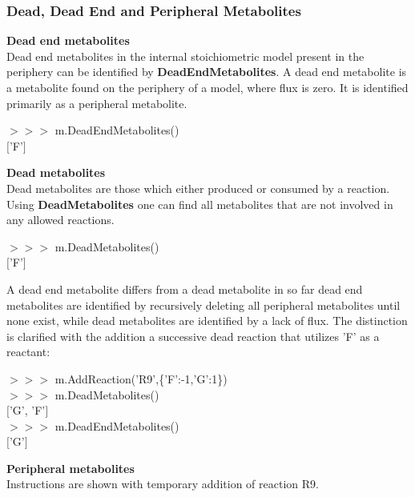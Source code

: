 
\subsubsection{Dead, Dead End and Peripheral Metabolites}

\textbf{Dead end metabolites} \\
Dead end metabolites in the internal stoichiometric model present in the periphery can be identified by \textbf{DeadEndMetabolites}. A dead end metabolite is a metabolite found on the periphery of a model, where flux is zero. It is identified primarily as a peripheral metabolite.

\begin{framed}
$>>>$ m.DeadEndMetabolites()\\
$[$'F'$]$
\end{framed}


\textbf{Dead metabolites}\\
Dead metabolites are those which either produced or consumed by a reaction. Using \textbf{DeadMetabolites} one can find all metabolites that are not involved in any allowed reactions.

\begin{framed}
$>>>$ m.DeadMetabolites()\\
$[$'F'$]$
\end{framed}

A dead end metabolite differs from a dead metabolite in so far dead end metabolites are identified by recursively deleting all peripheral metabolites until none exist, while dead metabolites are identified by a lack of flux. The distinction is clarified with the addition a successive dead reaction that utilizes 'F' as a reactant:

\begin{framed}
$>>>$ m.AddReaction('R9',\{'F':-1,'G':1\})\\
$>>>$ m.DeadMetabolites()\\
$[$'G', 'F'$]$\\

$>>>$ m.DeadEndMetabolites()\\
$[$'G'$]$
\end{framed}


\textbf{Peripheral metabolites}\\
Instructions are shown with temporary addition of reaction R9.

